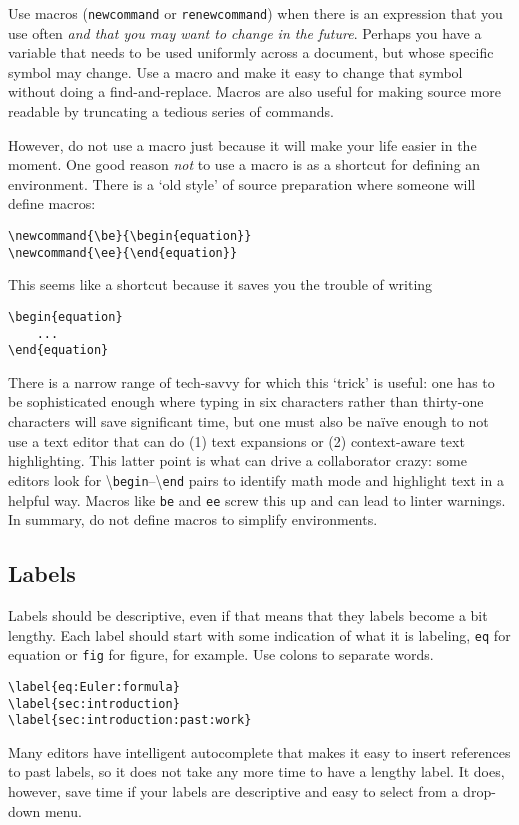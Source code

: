 Use macros (\texttt{newcommand} or \texttt{renewcommand}) when there is an expression that you use often \emph{and that you may want to change in the future}. Perhaps you have a variable that needs to be used uniformly across a document, but whose specific symbol may change. Use a macro and make it easy to change that symbol without doing a find-and-replace. Macros are also useful for making \LaTeXx source more readable by truncating a tedious series of commands. 

However, do not use a macro just because it will make your life easier in the moment. One good reason \emph{not} to use a macro is as a shortcut for defining an environment. There is a `old style' of source preparation where someone will define macros:
% 
\begin{lstlisting}[style=latexstyle]
\newcommand{\be}{\begin{equation}}
\newcommand{\ee}{\end{equation}}
\end{lstlisting}
% 
This seems like a shortcut because it saves you the trouble of writing
% 
\begin{lstlisting}[style=latexstyle]
\begin{equation}
	...
\end{equation}
\end{lstlisting}
% 
There is a narrow range of tech-savvy for which this `trick' is useful: one has to be sophisticated enough where typing in six characters rather than thirty-one characters will save significant time, but one must also be na\"ive enough to not use a text editor that can do (1) text expansions or (2) context-aware text highlighting. 
% 
This latter point is what can drive a collaborator crazy: some \LaTeXx editors look for \textbackslash\texttt{begin}--\textbackslash\texttt{end} pairs to identify math mode and highlight text in a helpful way. Macros like \texttt{be} and \texttt{ee} screw this up and can lead to linter warnings. In summary, do not define macros to simplify environments.


\subsection{Labels}

Labels should be descriptive, even if that means that they labels become a bit lengthy. Each label should start with some indication of what it is labeling, \texttt{eq} for equation or \texttt{fig} for figure, for example. Use colons to separate words.
% 
\begin{lstlisting}[style=latexstyle]
\label{eq:Euler:formula}
\label{sec:introduction}
\label{sec:introduction:past:work}
\end{lstlisting}
% 
Many \LaTeXx editors have intelligent autocomplete that makes it easy to insert references to past labels, so it does not take any more time to have a lengthy label. It does, however, save time if your labels are descriptive and easy to select from a drop-down menu. 


